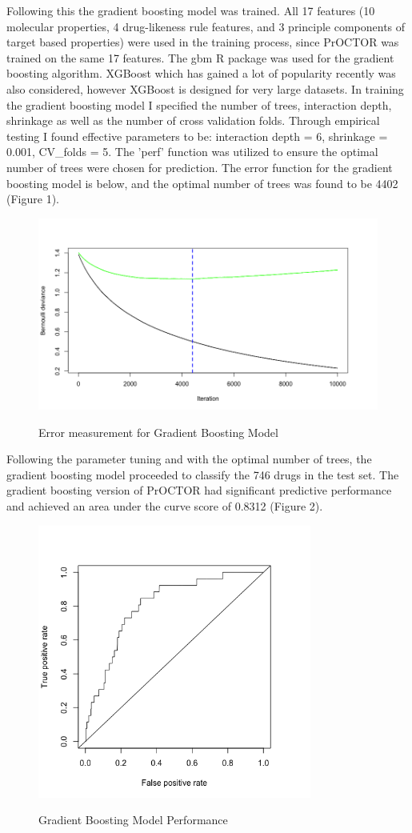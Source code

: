 \documentclass[12pt]{article}
\begin{document}
Following this the gradient boosting model was trained. All 17 features (10 molecular properties, 4 drug-likeness rule features, and 3 principle components of target based properties) were used in the training process, since PrOCTOR was trained on the same 17 features. The gbm R package was used for the gradient boosting algorithm. XGBoost which has gained a lot of popularity recently was also considered, however XGBoost is designed for very large datasets. In training the gradient boosting model I specified the number of trees, interaction depth, shrinkage as well as the number of cross validation folds. Through empirical testing I found effective parameters to be: interaction depth = 6, shrinkage = 0.001, CV_folds = 5. The 'perf' function was utilized to ensure the optimal number of trees were chosen for prediction. The error function for the gradient boosting model is below, and the optimal number of trees was found to be 4402 (Figure 1).
\begin{figure}[h!]
\centering
\includegraphics[width=12cm]{GBfullperf.png}
\label{fig:sub1}
  \caption{Error measurement for Gradient Boosting Model}
\end{figure}

Following the parameter tuning and with the optimal number of trees, the gradient boosting model proceeded to classify the 746 drugs in the test set. The gradient boosting version of PrOCTOR had significant predictive performance and achieved an area under the curve score of 0.8312 (Figure 2).
\begin{figure}[h!]
\centering
\includegraphics[width=9cm]{GBFullAUC.png}
  \label{fig:sub1}
  \caption{Gradient Boosting Model Performance}
\end{figure}
\end{document}
